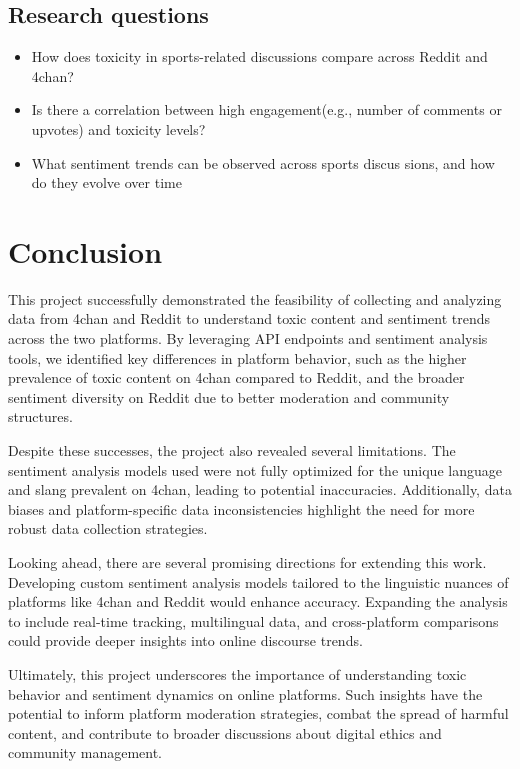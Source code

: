 \documentclass[sigconf]{acmart}
\begin{document}
\subsection{Research questions}
\begin{itemize}

\item How does toxicity in sports-related discussions compare
 across Reddit and 4chan?
 \item  Is there a correlation between high engagement(e.g., number
 of comments or upvotes) and toxicity levels?
 \item  What sentiment trends can be observed across sports discus
sions, and how do they evolve over time

\end{itemize}

\section{Conclusion}
This project successfully demonstrated the feasibility of collecting and analyzing data from 4chan and Reddit to understand toxic content and sentiment trends across the two platforms. By leveraging API endpoints and sentiment analysis tools, we identified key differences in platform behavior, such as the higher prevalence of toxic content on 4chan compared to Reddit, and the broader sentiment diversity on Reddit due to better moderation and community structures.

Despite these successes, the project also revealed several limitations. The sentiment analysis models used were not fully optimized for the unique language and slang prevalent on 4chan, leading to potential inaccuracies. Additionally, data biases and platform-specific data inconsistencies highlight the need for more robust data collection strategies.

Looking ahead, there are several promising directions for extending this work. Developing custom sentiment analysis models tailored to the linguistic nuances of platforms like 4chan and Reddit would enhance accuracy. Expanding the analysis to include real-time tracking, multilingual data, and cross-platform comparisons could provide deeper insights into online discourse trends.

Ultimately, this project underscores the importance of understanding toxic behavior and sentiment dynamics on online platforms. Such insights have the potential to inform platform moderation strategies, combat the spread of harmful content, and contribute to broader discussions about digital ethics and community management.
\end{document}

